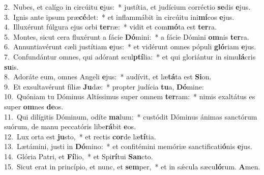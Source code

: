 {2.~}Nubes, et calígo in circúitu \textbf{e}jus:~* justítia, et judícium corréctio \textbf{se}dis \textbf{e}jus.\\
{3.~}Ignis ante ipsum præ\textbf{cé}det:~* et inflammábit in circúitu ini\textbf{mí}cos \textbf{e}jus.\\
{4.~}Illuxérunt fúlgura ejus orbi \textbf{ter}ræ:~* vidit et com\textbf{mó}ta est \textbf{ter}ra.\\
{5.~}Montes, sicut cera fluxérunt a fácie \textbf{Dó}mini:~* a fácie Dómini \textbf{om}nis \textbf{ter}ra.\\
{6.~}Annuntiavérunt cæli justítiam \textbf{e}jus:~* et vidérunt omnes pópuli \textbf{gló}riam \textbf{e}jus.\\
{7.~}Confundántur omnes, qui adórant scul\textbf{ptí}lia:~* et qui gloriántur in simu\textbf{lá}cris \textbf{su}is.\\
{8.~}Adoráte eum, omnes Angeli \textbf{e}jus:~* audívit, et læ\textbf{tá}ta est \textbf{Si}on.\\
{9.~}Et exsultavérunt fíliæ \textbf{Ju}dæ:~* propter judícia \textbf{tu}a, \textbf{Dó}mine:\\
{10.~}Quóniam tu Dóminus Altíssimus super omnem \textbf{ter}ram:~* nimis exaltátus es super \textbf{om}nes \textbf{de}os.\\
{11.~}Qui dilígitis Dóminum, odíte \textbf{ma}lum:~* custódit Dóminus ánimas sanctórum suórum, de manu peccatóris libe\textbf{rá}bit \textbf{e}os.\\
{12.~}Lux orta est \textbf{ju}sto,~* et rectis \textbf{cor}de læ\textbf{tí}tia.\\
{13.~}Lætámini, justi in \textbf{Dó}mino:~* et confitémini memóriæ sanctificati\textbf{ó}nis \textbf{e}jus.\\
{14.~}Glória Patri, et \textbf{Fí}lio,~* et Spi\textbf{rí}tui \textbf{San}cto.\\
{15.~}Sicut erat in princípio, et nunc, et \textbf{sem}per,~* et in sǽcula sæcu\textbf{ló}rum. \textbf{A}men.\\
